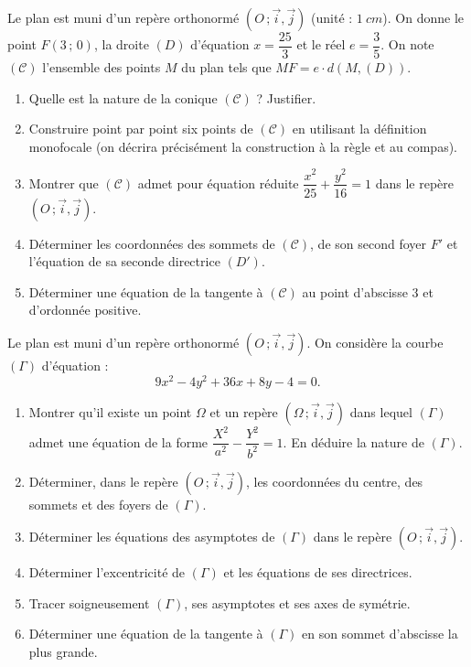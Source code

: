 \documentclass[11pt]{article}
\newcounter{popsec}
\newcounter{popsub}
\newcommand{\courssub}[1]{%
  \stepcounter{popsub}%
  \par\vspace{9pt}\noindent{\popxbold\fontsize{11.5}{13}\selectfont\color{popink}{\color{poporange}\thepopsec.\thepopsub}\hspace{6pt}#1}\par\nopagebreak\vspace{4pt}
}
\begin{document}
\courssub{Je me prépare au Bac}

\begin{exercice}
Le plan est muni d'un repère orthonormé $(O\,;\vec{i},\vec{j})$ (unité : $\SI{1}{cm}$). On donne le point $F(3\,;\,0)$, la droite $(D)$ d'équation $x = \dfrac{25}{3}$ et le réel $e = \dfrac{3}{5}$. On note $(\mathcal{C})$ l'ensemble des points $M$ du plan tels que $MF = e \cdot d(M, (D))$.
\begin{enumerate}
\item Quelle est la nature de la conique $(\mathcal{C})$ ? Justifier.
\item Construire point par point six points de $(\mathcal{C})$ en utilisant la définition monofocale (on décrira précisément la construction à la règle et au compas).
\item Montrer que $(\mathcal{C})$ admet pour équation réduite $\dfrac{x^{2}}{25} + \dfrac{y^{2}}{16} = 1$ dans le repère $(O\,;\vec{i},\vec{j})$.
\item Déterminer les coordonnées des sommets de $(\mathcal{C})$, de son second foyer $F'$ et l'équation de sa seconde directrice $(D')$.
\item Déterminer une équation de la tangente à $(\mathcal{C})$ au point d'abscisse $3$ et d'ordonnée positive.
\end{enumerate}
\end{exercice}

\begin{exercice}
Le plan est muni d'un repère orthonormé $(O\,;\vec{i},\vec{j})$. On considère la courbe $(\Gamma)$ d'équation :
\[ 9x^{2} - 4y^{2} + 36x + 8y - 4 = 0. \]
\begin{enumerate}
\item Montrer qu'il existe un point $\Omega$ et un repère $(\Omega\,;\vec{i},\vec{j})$ dans lequel $(\Gamma)$ admet une équation de la forme $\dfrac{X^{2}}{a^{2}} - \dfrac{Y^{2}}{b^{2}} = 1$. En déduire la nature de $(\Gamma)$.
\item Déterminer, dans le repère $(O\,;\vec{i},\vec{j})$, les coordonnées du centre, des sommets et des foyers de $(\Gamma)$.
\item Déterminer les équations des asymptotes de $(\Gamma)$ dans le repère $(O\,;\vec{i},\vec{j})$.
\item Déterminer l'excentricité de $(\Gamma)$ et les équations de ses directrices.
\item Tracer soigneusement $(\Gamma)$, ses asymptotes et ses axes de symétrie.
\item Déterminer une équation de la tangente à $(\Gamma)$ en son sommet d'abscisse la plus grande.
\end{enumerate}
\end{exercice}
\end{document}
